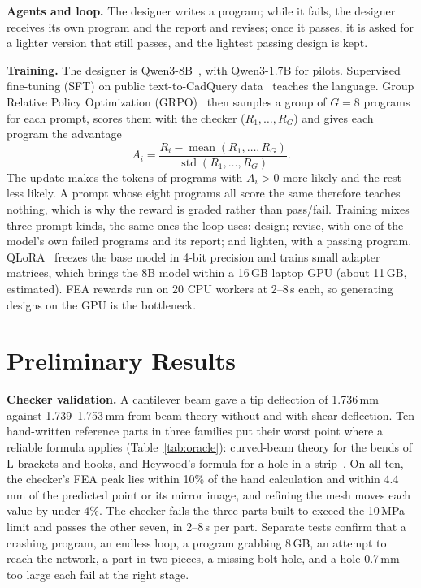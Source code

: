 \documentclass[conference]{IEEEtran}
\begin{document}
\textbf{Agents and loop.} The designer writes a program; while
it fails, the designer receives its own program and the report and revises; once it passes, it is asked
for a lighter version that still passes, and the lightest passing design is kept.

\textbf{Training.} The designer is Qwen3-8B~\cite{yang2025qwen3}, with Qwen3-1.7B for pilots.
Supervised fine-tuning (SFT) on public text-to-CadQuery data~\cite{guan2025cadcoder,rukhovich2024cadrecode}
teaches the language. Group Relative Policy Optimization (GRPO)~\cite{shao2024deepseekmath} then samples
a group of $G=8$ programs for each prompt, scores them with the checker ($R_1,\dots,R_G$) and gives each
program the advantage
\begin{equation}
A_i = \frac{R_i - \operatorname{mean}(R_1,\dots,R_G)}{\operatorname{std}(R_1,\dots,R_G)}.
\end{equation}
The update makes the tokens of programs with $A_i>0$ more likely and the rest less likely. A prompt whose
eight programs all score the same therefore teaches nothing, which is why the reward is graded rather
than pass/fail. Training mixes three prompt kinds, the same ones the loop uses: design; revise, with one
of the model's own failed programs and its report; and lighten, with a passing program.
QLoRA~\cite{dettmers2023qlora} freezes the base model in 4-bit precision and trains small adapter
matrices, which brings the 8B model within a 16\,GB laptop GPU (about 11\,GB, estimated). FEA rewards
run on 20 CPU workers at 2--8\,s each, so generating designs on the GPU is the bottleneck.

\section{Preliminary Results}

\textbf{Checker validation.} A cantilever beam gave a tip deflection of 1.736\,mm against
1.739--1.753\,mm from beam theory without and with shear deflection. Ten hand-written reference parts in three families put their worst point
where a reliable formula applies (Table~\ref{tab:oracle}): curved-beam theory for the bends of
L-brackets and hooks, and Heywood's formula for a hole in a strip~\cite{budynas2020shigley,pilkey2008peterson}.
On all ten, the checker's FEA peak lies within 10\% of the hand calculation and within 4.4\,mm of the
predicted point or its mirror image, and refining the mesh moves each value by under 4\%. The checker
fails the three parts built to exceed the 10\,MPa limit and passes the other seven, in 2--8\,s per
part. Separate tests confirm that a crashing program, an endless loop, a program grabbing 8\,GB, an
attempt to reach the network, a part in two pieces, a missing bolt hole, and a hole 0.7\,mm too large
each fail at the right stage.
\end{document}
